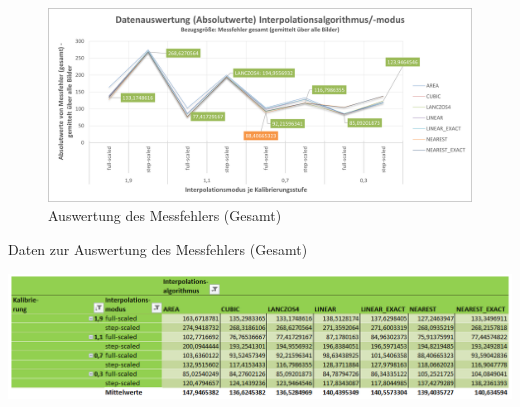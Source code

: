\documentclass[
fontsize=10pt, 
listof = totoc,
parskip = half	
]{report}
\begin{document}
\begin{figure}[H]
	\centering
	\includegraphics[width=\textwidth, height=\textheight, keepaspectratio]{pics/DA_Gesamt_Absolut_Alle}
	\caption{Auswertung des Messfehlers (Gesamt)}
	\label{fig:DAGesamtAbsolut_Alle}
\end{figure}
	
\begin{table}[H]
	\centering
	\caption{Daten zur Auswertung des Messfehlers (Gesamt)}
	\label{tab:DAGesamtAbsolutAlle}
	\includegraphics[width=\textwidth,height=\textheight,keepaspectratio]{pics/Tab_DA_Gesamt_Absolut_Alle}
\end{table}
\end{document}
